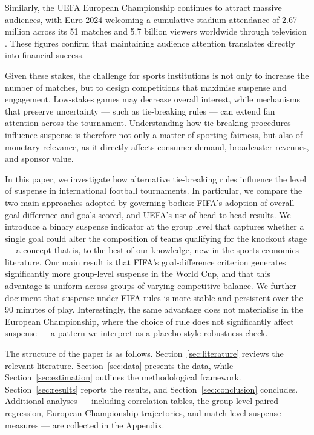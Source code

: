 \documentclass[11pt]{article}
\begin{document}
Similarly, the UEFA European Championship continues to attract massive audiences, with Euro 2024 welcoming a cumulative stadium attendance of 2.67 million across its 51 matches and 5.7 billion viewers worldwide through television \citep{uefa2024numbers, uefa2024remember}. These figures confirm that maintaining audience attention translates directly into financial success.

Given these stakes, the challenge for sports institutions is not only to increase the number of matches, but to design competitions that maximise suspense and engagement. Low-stakes games may decrease overall interest, while mechanisms that preserve uncertainty — such as tie-breaking rules — can extend fan attention across the tournament. Understanding how tie-breaking procedures influence suspense is therefore not only a matter of sporting fairness, but also of monetary relevance, as it directly affects consumer demand, broadcaster revenues, and sponsor value.

In this paper, we investigate how alternative tie-breaking rules influence the level of suspense in international football tournaments. In particular, we compare the two main approaches adopted by governing bodies: FIFA's adoption of overall goal difference and goals scored, and UEFA's use of head-to-head results. We introduce a binary suspense indicator at the group level that captures whether a single goal could alter the composition of teams qualifying for the knockout stage — a concept that is, to the best of our knowledge, new in the sports economics literature. Our main result is that FIFA's goal-difference criterion generates significantly more group-level suspense in the World Cup, and that this advantage is uniform across groups of varying competitive balance. We further document that suspense under FIFA rules is more stable and persistent over the 90 minutes of play. Interestingly, the same advantage does not materialise in the European Championship, where the choice of rule does not significantly affect suspense — a pattern we interpret as a placebo-style robustness check.

\vspace{0.5em}

The structure of the paper is as follows. Section~\ref{sec:literature} reviews the relevant literature. Section~\ref{sec:data} presents the data, while Section~\ref{sec:estimation} outlines the methodological framework. Section~\ref{sec:results} reports the results, and Section~\ref{sec:conclusion} concludes. Additional analyses — including correlation tables, the group-level paired regression, European Championship trajectories, and match-level suspense measures — are collected in the Appendix.
\end{document}
